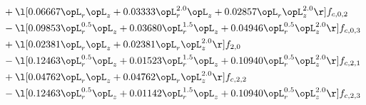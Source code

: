 \begin{alignat}{2}
& + \l[  0.06667 \opL_r \opL_z +  0.03333 \opL_r^{2.0} \opL_z +  0.02857 \opL_r \opL_z^{2.0}  \r] f_{c,0,2} \nonumber \\ 
& - \l[  0.09853 \opL_r^{0.5} \opL_z +  0.03680 \opL_r^{1.5} \opL_z +  0.04946 \opL_r^{0.5} \opL_z^{2.0}  \r] f_{c,0,3} \nonumber \\ 
& + \l[  0.02381 \opL_r \opL_z +  0.02381 \opL_r \opL_z^{2.0}  \r] f_{2,0} \nonumber \\ 
& - \l[  0.12463 \opL_r^{0.5} \opL_z +  0.01523 \opL_r^{1.5} \opL_z +  0.10940 \opL_r^{0.5} \opL_z^{2.0}  \r] f_{c,2,1} \nonumber \\ 
& + \l[  0.04762 \opL_r \opL_z +  0.04762 \opL_r \opL_z^{2.0}  \r] f_{c,2,2} \nonumber \\ 
& - \l[  0.12463 \opL_r^{0.5} \opL_z +  0.01142 \opL_r^{1.5} \opL_z +  0.10940 \opL_r^{0.5} \opL_z^{2.0}  \r] f_{c,2,3} \nonumber \\ 
\end{alignat} 


